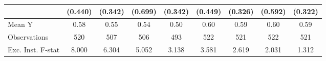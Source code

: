 {\begin{tabular}{l*{8}{c}}
                    &     (0.440)         &     (0.342)         &     (0.699)         &     (0.342)         &     (0.449)         &     (0.326)         &     (0.592)         &     (0.322)         \\
\midrule
Mean Y              &        0.58         &        0.55         &        0.54         &        0.50         &        0.60         &        0.59         &        0.60         &        0.59         \\
Observations        &         520         &         507         &         506         &         493         &         522         &         521         &         522         &         521         \\
Exc. Inst. F-stat   &       8.000         &       6.304         &       5.052         &       3.138         &       3.581         &       2.619         &       2.031         &       1.312         \\
\bottomrule
\end{tabular}
}
